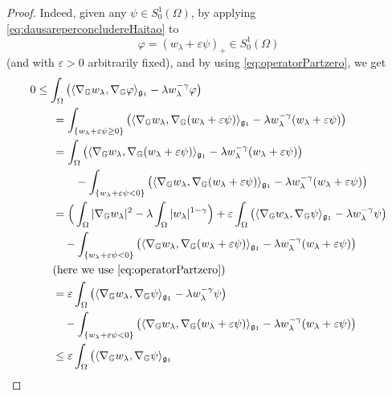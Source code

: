 \documentclass[11pt]{amsart}
\numberwithin{equation}{section} %
\theoremstyle{definition}
\begin{document}
\begin{proof}
			 Indeed, given any
			 $\psi\in S_0^1(\Omega)$, by applying
			 \eqref{eq:dausareperconcludereHaitao} to
			 $$\varphi = (w_\lambda+\varepsilon\psi)_+\in S_0^1(\Omega)$$
			 (and with $\varepsilon > 0$ arbitrarily fixed), and by using \eqref{eq:operatorPartzero}, we get
			 \begin{align*}
			  & 0 \leq \int_\Omega\big(\langle\nabla_\mathbb{G}w_\lambda,\nabla_\mathbb{G}\varphi\rangle_{\mathfrak{g}_{1}}
			 - {\lambda}w_\lambda^{-\gamma}\varphi\big)
			 \\
			 & \qquad = \int_{\{w_\lambda+\varepsilon\psi\geq 0\}}\big(\langle\nabla_\mathbb{G}w_\lambda,\nabla_\mathbb{G}(w_\lambda+\varepsilon\psi)\rangle_{\mathfrak{g}_{1}}
			 - {\lambda}w_\lambda^{-\gamma}(w_\lambda+\varepsilon\psi)\big) \\
			 & \qquad = \int_{\Omega}\big(\langle\nabla_\mathbb{G}w_\lambda,\nabla_\mathbb{G}(w_\lambda+\varepsilon\psi)\rangle_{\mathfrak{g}_{1}}
			 - {\lambda}w_\lambda^{-\gamma}(w_\lambda+\varepsilon\psi)\big)	 \\
			 & \qquad\qquad
			 - \int_{\{w_\lambda+\varepsilon\psi< 0\}}\big(\langle\nabla_\mathbb{G}w_\lambda,\nabla_\mathbb{G}(w_\lambda+\varepsilon\psi)\rangle_{\mathfrak{g}_{1}}
			 - {\lambda}w_\lambda^{-\gamma}(w_\lambda+\varepsilon\psi)\big)\\
			 & \qquad
			 = \Big(\int_\Omega|\nabla_\mathbb{G}w_\lambda|^2-
			 \lambda\int_\Omega|w_\lambda|^{1-\gamma}\Big)
			  +\varepsilon\int_\Omega\big(\langle\nabla_\mathbb{G}w_\lambda,\nabla_\mathbb{G}\psi\rangle_{\mathfrak{g}_{1}}
			 - {\lambda} w_\lambda^{-\gamma}\psi\big) \\
			 & \qquad\quad - \int_{\{w_\lambda+\varepsilon\psi< 0\}}\big(\langle\nabla_\mathbb{G}w_\lambda,\nabla_\mathbb{G}(w_\lambda+\varepsilon\psi)\rangle_{\mathfrak{g}_{1}}
			 - {\lambda}w_\lambda^{-\gamma}(w_\lambda+\varepsilon\psi)\big)
			 \\
			 & \qquad (\text{here we use \eqref{eq:operatorPartzero}}) \\
			 & \qquad = \varepsilon\int_\Omega\big(\langle\nabla_\mathbb{G}w_\lambda,\nabla_\mathbb{G}\psi\rangle_{\mathfrak{g}_{1}}
			 - {\lambda} w_\lambda^{-\gamma}\psi\big) \\
			 & \qquad\quad - \int_{\{w_\lambda+\varepsilon\psi< 0\}}\big(\langle\nabla_\mathbb{G}w_\lambda,\nabla_\mathbb{G}(w_\lambda+\varepsilon\psi)\rangle_{\mathfrak{g}_{1}}
			 - {\lambda}w_\lambda^{-\gamma}(w_\lambda+\varepsilon\psi)\big)
			 \\
			& \qquad \leq 
			\varepsilon\int_\Omega\big(\langle\nabla_\mathbb{G}w_\lambda,\nabla_\mathbb{G}\psi\rangle_{\mathfrak{g}_{1}}

\end{align*}
\end{proof}
\end{document}
